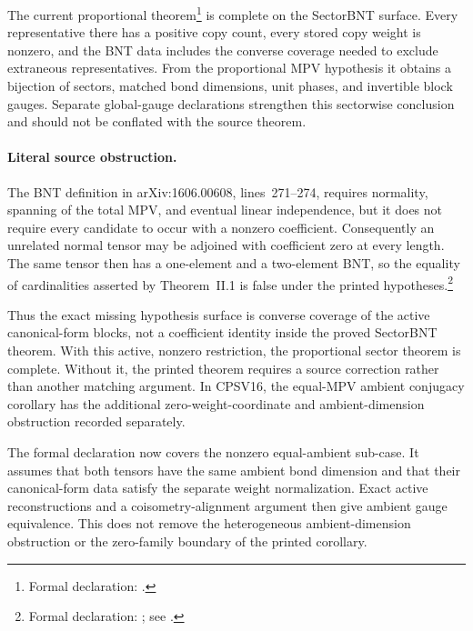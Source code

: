 \documentclass{article}
\begin{document}
The current proportional theorem\footnote{Formal declaration:
  .}
is complete on the SectorBNT surface.  Every representative there has a
positive copy count, every stored copy weight is nonzero, and the BNT data
includes the converse coverage needed to exclude extraneous representatives.
From the proportional MPV hypothesis it obtains a bijection of sectors,
matched bond dimensions, unit phases, and invertible block gauges.  Separate
global-gauge declarations strengthen this sectorwise conclusion and should not
be conflated with the source theorem.

\paragraph{Literal source obstruction.}
The BNT definition in arXiv:1606.00608, lines~271--274, requires normality,
spanning of the total MPV, and eventual linear independence, but it does not
require every candidate to occur with a nonzero coefficient.  Consequently an
unrelated normal tensor may be adjoined with coefficient zero at every length.
The same tensor then has a one-element and a two-element BNT, so the equality
of cardinalities asserted by Theorem~II.1 is false under the printed
hypotheses.\footnote{Formal declaration:
  ; see
  .}

Thus the exact missing hypothesis surface is converse coverage of the active
canonical-form blocks, not a coefficient identity inside the proved
SectorBNT theorem.  With this active, nonzero restriction, the proportional
sector theorem is complete.  Without it, the printed theorem requires a
source correction rather than another matching argument.  In CPSV16, the
equal-MPV ambient conjugacy corollary has the additional zero-weight-coordinate
and ambient-dimension obstruction recorded separately.

The formal declaration
now covers the nonzero equal-ambient sub-case.  It assumes that both tensors
have the same ambient bond dimension and that their canonical-form data satisfy
the separate weight normalization.  Exact active reconstructions and a
coisometry-alignment argument then give ambient gauge equivalence.  This does
not remove the heterogeneous ambient-dimension obstruction or the zero-family
boundary of the printed corollary.
\end{document}
